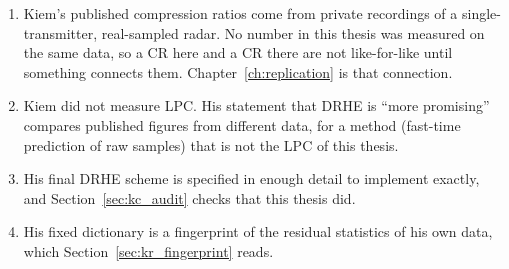 \begin{enumerate}
\item Kiem's published compression ratios come from private recordings of a
single-transmitter, real-sampled radar. No number in this thesis was measured
on the same data, so a CR here and a CR there are not like-for-like until
something connects them. Chapter~\ref{ch:replication} is that connection.
\item Kiem did not measure LPC. His statement that DRHE is ``more promising''
compares published figures from different data, for a method (fast-time
prediction of raw samples) that is not the LPC of this thesis.
\item His final DRHE scheme is specified in enough detail to implement exactly,
and Section~\ref{sec:kc_audit} checks that this thesis did.
\item His fixed dictionary is a fingerprint of the residual statistics of his
own data, which Section~\ref{sec:kr_fingerprint} reads.
\end{enumerate}
